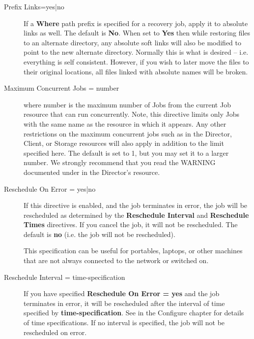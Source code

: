 \begin{description}
\item [Prefix Links=\lt{}yes|no\gt{}]
   If a {\bf Where} path prefix is specified for a recovery job, apply it
   to absolute links as well.  The default is {\bf No}.  When set to {\bf
   Yes} then while restoring files to an alternate directory, any absolute
   soft links will also be modified to point to the new alternate
   directory.  Normally this is what is desired -- i.e.  everything is self
   consistent.  However, if you wish to later move the files to their
   original locations, all files linked with absolute names will be broken.

\item [Maximum Concurrent Jobs = \lt{}number\gt{}]
   where \lt{}number\gt{}  is the maximum number of Jobs from the current Job
resource that  can run concurrently. Note, this directive limits only Jobs 
with the same name as the resource in which it appears. Any  other
restrictions on the maximum concurrent jobs such as in  the Director, Client,
or Storage resources will also apply in addition to  the limit specified here.
The  default is set to 1, but you may set it to a larger number.  We strongly
recommend that you read the WARNING documented under  
 in the Director's
resource.  

\item [Reschedule On Error = \lt{}yes|no\gt{}]
   If this directive is enabled,  and the job terminates in error, the job will
be rescheduled as determined  by the {\bf Reschedule Interval} and {\bf
Reschedule Times} directives.  If you cancel the job, it will not be
rescheduled. The default is  {\bf no} (i.e. the job will not be rescheduled). 


This specification can be useful for portables, laptops, or other  machines
that are not always connected to the network or switched on.  

\item [Reschedule Interval = \lt{}time-specification\gt{}]
   If you have  specified {\bf Reschedule On Error = yes} and the job terminates
in  error, it will be rescheduled after the interval of time specified  by
{\bf time-specification}. See 
 in the Configure
chapter for  details of time specifications. If no interval is specified, the 
job will not be rescheduled on error. 


\end{description}
